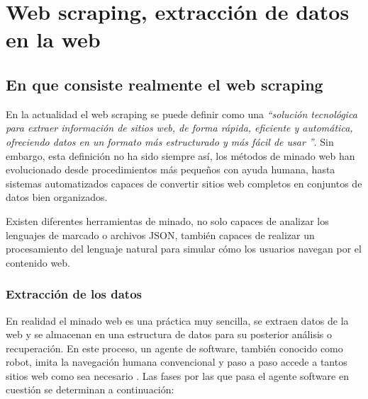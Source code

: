 \chapter{Web scraping, extracción de datos en la web}
\label{cha:web scraping, extraccion de datos en la web}

\section{En que consiste realmente el web scraping}
\label{sec:en que consiste realmente el web scraping}

En la actualidad el web scraping se puede definir como una \emph{“solución tecnológica para extraer
información de sitios web, de forma rápida, eficiente y automática, ofreciendo datos en un formato más
estructurado y más fácil de usar \cite{web-scraping-osmar-castrillo}”}. Sin embargo, esta definición no ha
sido siempre así, los métodos de minado web han evolucionado desde procedimientos más pequeños con ayuda
humana, hasta sistemas automatizados capaces de convertir sitios web completos en conjuntos de datos bien
organizados.

Existen diferentes herramientas de minado, no solo capaces de analizar los lenguajes de marcado o archivos
JSON, también capaces de realizar un procesamiento del lenguaje natural para simular cómo los usuarios
navegan por el contenido web.

\subsection{Extracción de los datos}
\label{subsec:extraccion de los datos}

En realidad el minado web es una práctica muy sencilla, se extraen datos de la web y se almacenan en una
estructura de datos para su posterior análisis o recuperación. En este proceso, un agente de software,
también conocido como robot, imita la navegación humana convencional y paso a paso accede a tantos sitios
web como sea necesario \cite{web-scraping-api-world}. Las fases por las que pasa el agente software en
cuestión se determinan a continuación:

